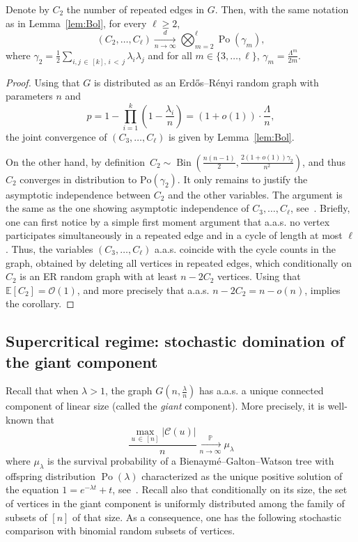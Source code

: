 \documentclass[AHL,Unicode,longabstracts,published]{cedram}
\renewcommand{\Pr}{\mathbb{P}}
\newcommand{\bbE}{\mathbb{E}}
\newcommand{\cO}{\mathcal{O}}
\newcommand{\cC}{\mathcal{C}}
\DeclareMathOperator{\rPo}{Po}
\DeclareMathOperator{\rBin}{Bin}
\begin{document}
\begin{coro}\label{cor:Bol}
Denote by $C_2$ the number of repeated edges in $G$. Then, with the same notation as in Lemma~\ref{lem:Bol}, for every $\ell\ge 2$,
\[
(C_2, \ldots, C_{\ell})\xrightarrow[n\to \infty]{d} \bigotimes_{m=2}^\ell \rPo(\gamma_m),
\]
where $\gamma_2 = \tfrac{1}{2} \sum_{i,j\,\in\,[k],\, i\,<\,j} \lambda_i \lambda_j$ and for all $m\in \{3,\dots,\ell\}$, $\gamma_m = \tfrac{\Lambda^m}{2m}$.
\end{coro}
\begin{proof}
Using that $G$ is distributed as an Erd\H{o}s--Rényi random graph with parameters $n$ and
\[
p = 1-\prod_{i=1}^k \left(1-\frac{\lambda_i}{n}\right) =(1+o(1))\cdot \frac{\Lambda}{n},
\]
the joint convergence of $(C_3, \ldots, C_\ell)$ is given by Lemma~\ref{lem:Bol}.

On the other hand, by definition~$C_2\sim\rBin(\tfrac{n(n-1)}{2},\tfrac{2(1+o(1))\gamma_2}{n^2})$, and thus $C_2$ converges in distribution to $\text{Po}(\gamma_2)$. It only remains to justify the asymptotic independence between $C_2$ and the other variables. The argument is the same as the one showing asymptotic independence of $C_3,\dots,C_\ell$, see~\cite[Theorem~4.8 and Corollary~4.9]{Bol01}. Briefly, one can first notice by a simple first moment argument that a.a.s. no vertex participates simultaneously in a repeated edge and in a cycle of length at most $\ell$. Thus, the variables $(C_3,\dots,C_\ell)$ a.a.s. coincide with the cycle counts in the graph, obtained by deleting all vertices in repeated edges, which conditionally on $C_2$ is an ER random graph with at least $n-2C_2$ vertices. Using that $\bbE[C_2]=\cO(1)$, and more precisely that a.a.s. $n-2C_2 = n -o(n)$, implies the corollary.
\end{proof}



\subsection{Supercritical regime: stochastic domination of the giant component}\label{sec:stoc.dom}
Recall that when $\lambda>1$, the graph $G(n,\tfrac \lambda n)$ has a.a.s. a unique connected component of linear size (called the \emph{giant} component). More precisely, it is well-known that
\begin{equation}\label{LLN.giant}
\frac{\max_{u\,\in\,[n]} |\cC(u)|}{n} \xrightarrow[n\to\infty]{\Pr} \mu_\lambda
\end{equation}
where $\mu_\lambda$ is the survival probability of a Bienaymé--Galton--Watson tree with offspring distribution $\rPo(\lambda)$ characterized as the unique positive solution of the equation $1=e^{-\lambda t} + t$, see~\cite[display (3.6.2) and Theorem~4.8]{Hof16}. Recall also that conditionally on its size, the set of vertices in the giant component is uniformly distributed among the family of subsets of $[n]$ of that size. As a consequence, one has the following stochastic comparison with binomial random subsets of vertices.
\end{document}
